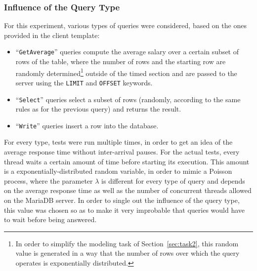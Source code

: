 \documentclass[journal]{IEEEtran}
\theoremstyle{definition}
\newcommand{\java}[1]{\texttt{#1}}
\newcommand{\sql}[1]{\texttt{#1}}
\begin{document}
\subsubsection{Influence of the Query Type}
For this experiment, various types of queries were considered, based on the ones provided in the client template:
\begin{itemize}
	\item ``\java{GetAverage}'' queries compute the average salary over a certain subset of rows of the table, where the number of rows and the starting row are randomly determined\footnote{In order to simplify the modeling task of Section~\ref{sec:task2}, this random value is generated in a way that the number of rows over which the query operates is exponentially distributed.} outside of the timed section and are passed to the server using the \sql{LIMIT} and \sql{OFFSET} keywords.
	\item ``\java{Select}'' queries select a subset of rows (randomly, according to the same rules as for the previous query) and returns the result.
	\item ``\java{Write}'' queries insert a row into the database.
\end{itemize}

For every type, tests were run multiple times, in order to get an idea of the average response time without inter-arrival pauses.
For the actual tests, every thread waits a certain amount of time before starting its execution.
This amount is a exponentially-distributed random variable, in order to mimic a Poisson process, where the parameter \(\lambda\) is different for every type of query and depends on the average response time as well as the number of concurrent threads allowed on the MariaDB server.
In order to single out the influence of the query type, this value was chosen so as to make it very improbable that queries would have to wait before being answered.
\end{document}
